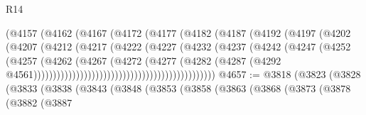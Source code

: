 \begin{lexlean}{R14}
\begin{coremodule}
{{{{{{{{{{{{{{{{{{{{{{{{{{{{{{{{{{{{{{{{{{{{{{{{{{{{{{{{{{{{{{{{{{{{{{{{{{{{{{{{{{                                          (@4157
                                            (@4162
                                              (@4167
                                                (@4172
                                                  (@4177
                                                    (@4182
                                                      (@4187
                                                        (@4192
                                                          (@4197
                                                            (@4202
                                                              (@4207
                                                                (@4212
                                                                  (@4217
                                                                    (@4222
                                                                      (@4227
                                                                        (@4232
                                                                          (@4237
                                                                            (@4242
                                                                              (@4247
                                                                                (@4252
                                                                                  (@4257
                                                                                    (@4262
                                                                                      (@4267
                                                                                        (@4272
                                                                                          (@4277
                                                                                            (@4282
                                                                                              (@4287
                                                                                                (@4292
                                                                                                  @4561)))))))))))))))))))))))))))))))))))))))))))))))
@4657 := @3818
    (@3823
      (@3828
        (@3833
          (@3838
            (@3843
              (@3848
                (@3853
                  (@3858
                    (@3863
                      (@3868
                        (@3873
                          (@3878
                            (@3882
                              (@3887
}}}}}}}}}}}}}}}}}}}}}}}}}}}}}}}}}}}}}}}}}}}}}}}}}}}}}}}}}}}}}}}}}}}}}}}}}}}}}}}}}}
\end{coremodule}
\end{lexlean}
